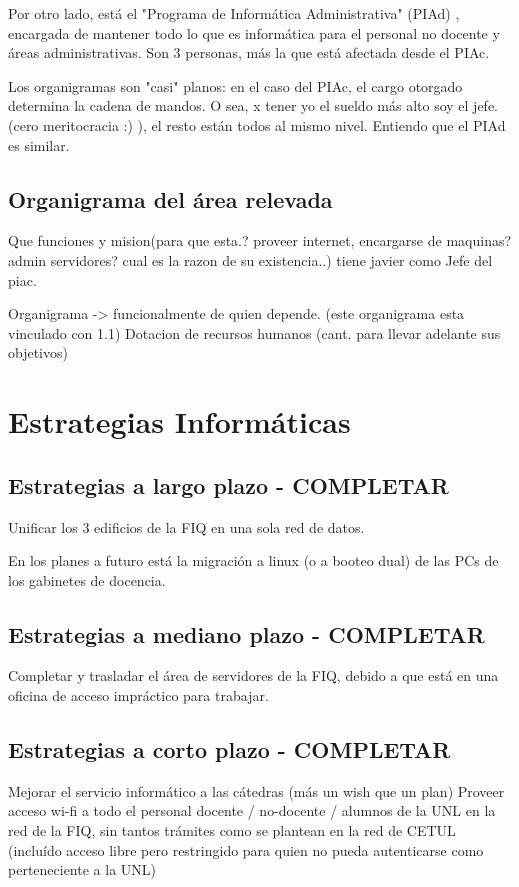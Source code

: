 \documentclass[10pt,a4paper,final]{article}
\begin{document}
Por otro lado, está el "Programa de Informática Administrativa" (PIAd) , encargada de mantener todo lo que es informática para el personal no docente y áreas administrativas. Son 3 personas, más la que está afectada desde el PIAc.

Los organigramas son "casi" planos: en el caso del PIAc, el cargo otorgado determina la cadena de mandos. O sea, x tener yo el sueldo más alto soy el jefe.  (cero meritocracia :) ), el resto están todos al mismo nivel. Entiendo que el PIAd es similar.

\subsection{Organigrama del área relevada}
Que funciones y  mision(para que esta.? proveer internet, encargarse de maquinas? admin servidores? cual es la razon de su existencia..) tiene javier como Jefe del piac.

    Organigrama -> funcionalmente de quien depende. (este organigrama esta vinculado con 1.1)
          Dotacion de recursos humanos (cant. para llevar adelante sus objetivos)
\section{Estrategias Informáticas}
\subsection{Estrategias a largo plazo - COMPLETAR}
Unificar los 3 edificios de la FIQ en una sola red de datos.

En los planes a futuro está la migración a linux (o a booteo dual) de las PCs de los gabinetes de docencia.
\subsection{Estrategias a mediano plazo - COMPLETAR}
Completar y trasladar el área de servidores de la FIQ, debido a que está en una oficina de acceso impráctico para trabajar.
\subsection{Estrategias a corto plazo - COMPLETAR}
Mejorar el servicio informático a las cátedras (más un wish que un plan)
Proveer acceso wi-fi a todo el personal docente / no-docente / alumnos de la UNL en la red de la FIQ, sin tantos trámites como se plantean en la red de CETUL (incluído acceso libre pero restringido para quien no pueda autenticarse como perteneciente a la UNL)
\end{document}
